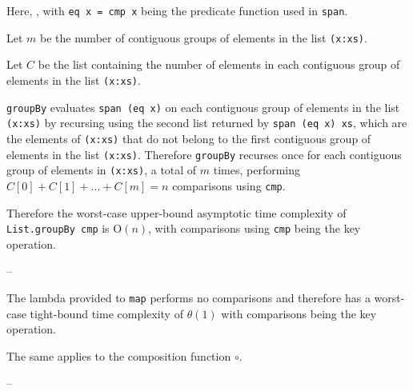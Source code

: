 \documentclass[../main.tex]{subfiles}
\begin{document}

Here, , with \texttt{eq x = cmp x} being the predicate function used in \texttt{span}. %

Let $m$ be the number of contiguous groups of elements in the list \texttt{(x:xs)}.

Let $C$ be the list containing the number of elements in each contiguous group of elements in the list \texttt{(x:xs)}.

\texttt{groupBy} evaluates \texttt{span (eq x)} on each contiguous group of elements in the list \texttt{(x:xs)} by recursing
using the second list returned by \texttt{span (eq x) xs}, which are the elements of \texttt{(x:xs)} that do not belong to the first contiguous group of elements in the list \texttt{(x:xs)}.  Therefore \texttt{groupBy} recurses once for each contiguous group of elements in \texttt{(x:xs)}, a total of $m$ times, performing $C[0] + C[1] + ... + C[m] = n$ comparisons using \texttt{cmp}.

Therefore the worst-case upper-bound asymptotic time complexity of \texttt{List.groupBy cmp} is O$(n)$, with comparisons using \texttt{cmp} being the key operation.
\qedsymbol

--

The lambda provided to \texttt{map} performs no comparisons and therefore has a worst-case tight-bound time complexity of
$\theta(1)$ with comparisons being the key operation.

The same applies to the composition function $\circ$.

--







\end{document}
